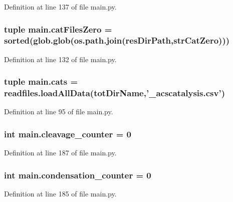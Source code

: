 Definition at line 137 of file main.\-py.

\hypertarget{a00117_a7ab6089d577bd60acf22b92e84930523}{
\subsubsection[{cat\-Files\-Zero}]{\setlength{\rightskip}{0pt plus 5cm}tuple main.\-cat\-Files\-Zero = sorted(glob.\-glob(os.\-path.\-join({\bf res\-Dir\-Path},{\bf str\-Cat\-Zero})))}}\label{a00117_a7ab6089d577bd60acf22b92e84930523}


Definition at line 132 of file main.\-py.

\hypertarget{a00117_adc0282a6415a88834556e66807bcc800}{
\subsubsection[{cats}]{\setlength{\rightskip}{0pt plus 5cm}tuple main.\-cats = readfiles.\-load\-All\-Data({\bf tot\-Dir\-Name},'\-\_\-acscatalysis.\-csv')}}\label{a00117_adc0282a6415a88834556e66807bcc800}


Definition at line 95 of file main.\-py.

\hypertarget{a00117_aba28788973ae3e9140b53078efe5d204}{
\subsubsection[{cleavage\-\_\-counter}]{\setlength{\rightskip}{0pt plus 5cm}int main.\-cleavage\-\_\-counter = 0}}\label{a00117_aba28788973ae3e9140b53078efe5d204}


Definition at line 187 of file main.\-py.

\hypertarget{a00117_a358b60986e7e25df0dfb61562b7aa3e2}{
\subsubsection[{condensation\-\_\-counter}]{\setlength{\rightskip}{0pt plus 5cm}int main.\-condensation\-\_\-counter = 0}}\label{a00117_a358b60986e7e25df0dfb61562b7aa3e2}


Definition at line 185 of file main.\-py.

